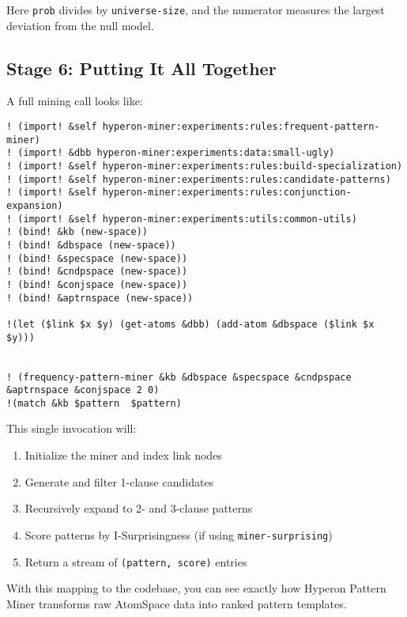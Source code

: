 \documentclass{article}
\begin{document}
Here \texttt{prob} divides by \texttt{universe-size}, and the numerator measures the largest deviation from the null model.

\subsection{Stage 6: Putting It All Together}

A full mining call looks like:

\begin{verbatim}
! (import! &self hyperon-miner:experiments:rules:frequent-pattern-miner)
! (import! &dbb hyperon-miner:experiments:data:small-ugly)
! (import! &self hyperon-miner:experiments:rules:build-specialization)
! (import! &self hyperon-miner:experiments:rules:candidate-patterns)
! (import! &self hyperon-miner:experiments:rules:conjunction-expansion)
! (import! &self hyperon-miner:experiments:utils:common-utils)
! (bind! &kb (new-space))
! (bind! &dbspace (new-space))
! (bind! &specspace (new-space))
! (bind! &cndpspace (new-space))
! (bind! &conjspace (new-space))
! (bind! &aptrnspace (new-space))

!(let ($link $x $y) (get-atoms &dbb) (add-atom &dbspace ($link $x $y)))


! (frequency-pattern-miner &kb &dbspace &specspace &cndpspace &aptrnspace &conjspace 2 0)
!(match &kb $pattern  $pattern)
\end{verbatim}

This single invocation will:

\begin{enumerate}
  \item Initialize the miner and index link nodes
  \item Generate and filter 1-clause candidates
  \item Recursively expand to 2- and 3-clause patterns
  \item Score patterns by I-Surprisingness (if using \texttt{miner-surprising})
  \item Return a stream of \texttt{(pattern, score)} entries
\end{enumerate}

With this mapping to the codebase, you can see exactly how Hyperon Pattern Miner transforms raw AtomSpace data into ranked pattern templates.
\end{document}
